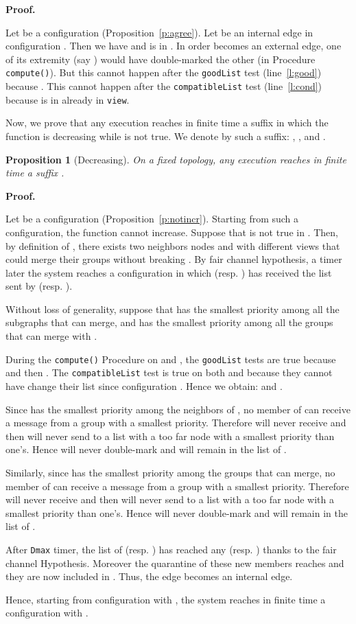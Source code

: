 \documentclass[11pt,english]{article}
\newtheorem{proposition}{Proposition}
\newenvironment{proof}[1][0cm]{
  \begin{list}{\bf Proof.~}{
      \setlength{\itemindent}{0cm}
      \setlength{\labelsep}{0cm}
      \setlength{\labelwidth}{#1}
      \setlength{\leftmargin}{#1}
    \item
    }
}{\hfill
  \end{list}
}
\begin{document}
\begin{proof}
  Let  be a configuration (Proposition~\ref{p:agree}).
  Let  be an internal edge in configuration . Then we have  and  is in .
In order  becomes an external edge, one of its extremity (say )
  would have double-marked the other (in Procedure \texttt{compute()}). But this
  cannot happen after the \texttt{goodList} test (line~\ref{l:good}) because . This cannot happen after the \texttt{compatibleList}
  test (line~\ref{l:cond}) because  is in already in \texttt{view}.
\end{proof}

Now, we prove that any execution reaches in finite time a suffix in which the
function  is decreasing while  is not true. We denote by
 such a suffix: , ,  and .

 \begin{proposition}[Decreasing]\label{p:decr}
 On a fixed topology, any execution  reaches in finite time a suffix .
 \end{proposition}

\begin{proof}
  Let  be a configuration
  (Proposition~\ref{p:notincr}). Starting from such a configuration, the 
  function cannot increase.
Suppose that  is not true in . Then, by definition of , there
  exists two neighbors nodes  and  with different views that could merge
  their groups without breaking . By fair channel hypothesis, a timer
  later the system reaches a configuration  in which  (resp. ) has
  received the list sent by  (resp. ).

  Without loss of generality, suppose that  has the smallest priority
  among all the subgraphs that can merge, and  has the smallest priority
  among all the groups that can merge with .

  During the \texttt{compute()} Procedure on  and , the \texttt{goodList}
  tests are true because  and then . The \texttt{compatibleList} test is true on both  and 
  because they cannot have change their list since configuration . Hence we
  obtain:  and .

  Since  has the smallest priority among the neighbors of , no member
  of  can receive a message from a group with a smallest
  priority. Therefore  will never receive and then will never send to  a
  list with a too far node with a smallest priority than  one's. Hence 
  will never double-mark  and  will remain in the list of .

  Similarly, since  has the smallest priority among the groups that can
  merge, no member of  can receive a message from a group with a smallest
  priority. Therefore  will never receive and then will never send to  a
  list with a too far node with a smallest priority than  one's. Hence 
  will never double-mark  and  will remain in the list of .

  After \texttt{Dmax} timer, the list of  (resp. ) has reached any  (resp. ) thanks to the fair channel Hypothesis. Moreover the
  quarantine of these new members reaches  and they are now included in
  . Thus, the edge  becomes an internal edge.

  Hence, starting from configuration  with , the system reaches
  in finite time a configuration  with .
\end{proof}
\end{document}
